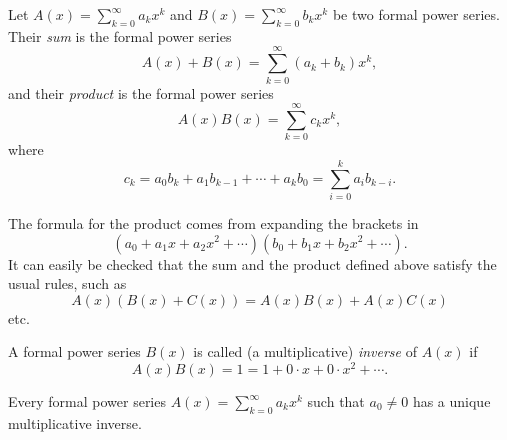 \begin{page}
\setcounter{section}{2}
\setcounter{subsection}{2}
\setcounter{dfn}{1}
\label{portion:727}

\begin{dfn}
Let $A(x) = \sum_{k=0}^\infty a_k x^k$ and $B(x) = \sum_{k=0}^\infty b_k x^k$ be two formal power series.
Their \emph{sum} is the formal power series
\[
A(x) + B(x) = \sum_{k=0}^\infty (a_k + b_k)x^k,
\]
and their \emph{product} is the formal power series
\[
A(x)B(x) = \sum_{k=0}^\infty c_k x^k,
\]
where
\[
c_k = a_0b_k + a_1b_{k-1} + \cdots + a_kb_0 = \sum_{i=0}^k a_i b_{k-i}.
\]
\end{dfn}

\end{page}

\begin{page}
\setcounter{section}{2}
\setcounter{subsection}{2}
\setcounter{dfn}{1}
\label{portion:728}

The formula for the product comes from expanding the brackets in
\[
(a_0 + a_1 x + a_2 x^2 + \cdots)(b_0 + b_1 x + b_2 x^2 + \cdots).
\]
It can easily be checked that the sum and the product defined above satisfy the usual rules, such as
\[
A(x)(B(x) + C(x)) = A(x)B(x) + A(x)C(x)
\]
etc.


\end{page}

\begin{page}
\setcounter{section}{2}
\setcounter{subsection}{2}
\setcounter{dfn}{2}
\label{portion:730}

\begin{dfn}
A formal power series $B(x)$ is called (a multiplicative) \emph{inverse} of $A(x)$ if
\[
A(x)B(x) = 1 = 1 + 0 \cdot x + 0 \cdot x^2 + \cdots.
\]
\end{dfn}

\end{page}

\begin{page}
\setcounter{section}{2}
\setcounter{subsection}{2}
\setcounter{dfn}{3}
\label{portion:733}

\begin{lem}
\label{lem:MultInverse}
Every formal power series $A(x) = \sum_{k=0}^\infty a_k x^k$ such that $a_0 \ne 0$
has a unique multiplicative inverse.
\end{lem}

\end{page}

